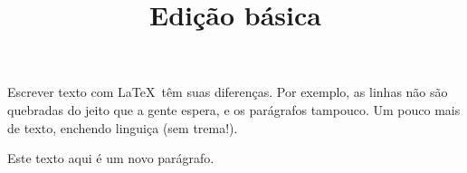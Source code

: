 \documentclass[12pt]{memoir}
\begin{document}
\title{Edição básica}
\maketitle

Escrever texto com \LaTeX\ têm suas diferenças. 
Por exemplo, as linhas não são quebradas 
do jeito que a gente espera, 
e os parágrafos tampouco. 
Um pouco mais de texto, 
enchendo linguiça 
(sem             trema!).










Este
texto
aqui
é
um
novo parágrafo.
\end{document}
